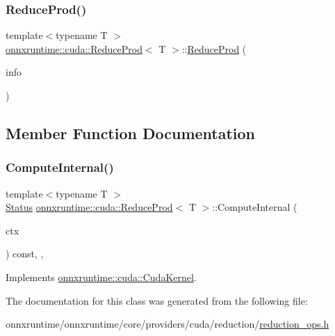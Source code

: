 \subsubsection{\texorpdfstring{Reduce\+Prod()}{ReduceProd()}}
{\footnotesize\ttfamily template$<$typename T $>$ \\
\mbox{\hyperlink{classonnxruntime_1_1cuda_1_1ReduceProd}{onnxruntime\+::cuda\+::\+Reduce\+Prod}}$<$ T $>$\+::\mbox{\hyperlink{classonnxruntime_1_1cuda_1_1ReduceProd}{Reduce\+Prod}} (\begin{DoxyParamCaption}\item[{const \mbox{\hyperlink{classonnxruntime_1_1OpKernelInfo}{Op\+Kernel\+Info}} \&}]{info }\end{DoxyParamCaption})\hspace{0.3cm}{\ttfamily [inline]}}



\subsection{Member Function Documentation}
\mbox{\label{classonnxruntime_1_1cuda_1_1ReduceProd_a730e4b8b638b52810b8e50ed11e7d7fe}} 
\subsubsection{\texorpdfstring{Compute\+Internal()}{ComputeInternal()}}
{\footnotesize\ttfamily template$<$typename T $>$ \\
\mbox{\hyperlink{classonnxruntime_1_1common_1_1Status}{Status}} \mbox{\hyperlink{classonnxruntime_1_1cuda_1_1ReduceProd}{onnxruntime\+::cuda\+::\+Reduce\+Prod}}$<$ T $>$\+::Compute\+Internal (\begin{DoxyParamCaption}\item[{\mbox{\hyperlink{classonnxruntime_1_1OpKernelContext}{Op\+Kernel\+Context}} $\ast$}]{ctx }\end{DoxyParamCaption}) const\hspace{0.3cm}{\ttfamily [inline]}, {\ttfamily [override]}, {\ttfamily [virtual]}}



Implements \mbox{\hyperlink{classonnxruntime_1_1cuda_1_1CudaKernel_aca7af04ae448017d6023d30bba231ebb}{onnxruntime\+::cuda\+::\+Cuda\+Kernel}}.



The documentation for this class was generated from the following file\+:\begin{DoxyCompactItemize}
\item 
onnxruntime/onnxruntime/core/providers/cuda/reduction/\mbox{\hyperlink{cuda_2reduction_2reduction__ops_8h}{reduction\+\_\+ops.\+h}}\end{DoxyCompactItemize}

